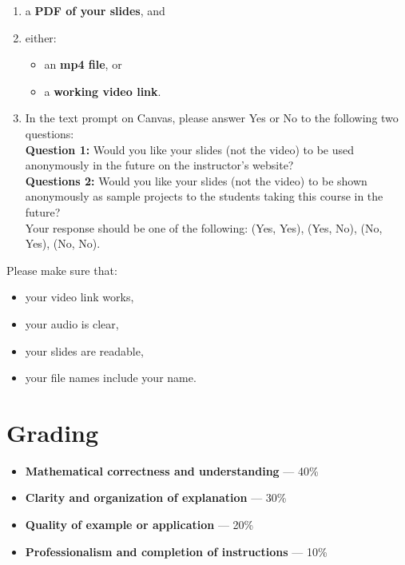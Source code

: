 \documentclass[11pt]{article}
\begin{document}
\begin{enumerate}[leftmargin=*]
    \item a \textbf{PDF of your slides}, and
    \item either:
    \begin{itemize}[leftmargin=*]
        \item an \textbf{mp4 file}, or
        \item a \textbf{working  video link}.
    \end{itemize}
\item In the text prompt on Canvas, please answer Yes or No to the following two questions: \\ \textbf{Question 1: }Would you like your slides (not the video) to be used anonymously in the future on the instructor's website? 
\\ \textbf{Questions 2:} Would you like your slides (not the video) to be shown anonymously as sample projects to the students taking this course in the future?\\

        Your response should be one of the following: (Yes, Yes), (Yes, No), (No, Yes), (No, No).
\end{enumerate}

Please make sure that:
\begin{itemize}[leftmargin=*]
    \item your video link works,
    \item your audio is clear,
    \item your slides are readable,
    \item your file names include your name.
\end{itemize}

\section*{Grading}


\begin{itemize}[leftmargin=*]
    \item \textbf{Mathematical correctness and understanding} --- 40\%
    \item \textbf{Clarity and organization of explanation} --- 30\%
    \item \textbf{Quality of example or application} --- 20\%
    \item \textbf{Professionalism and completion of instructions} --- 10\%
\end{itemize}
\end{document}
